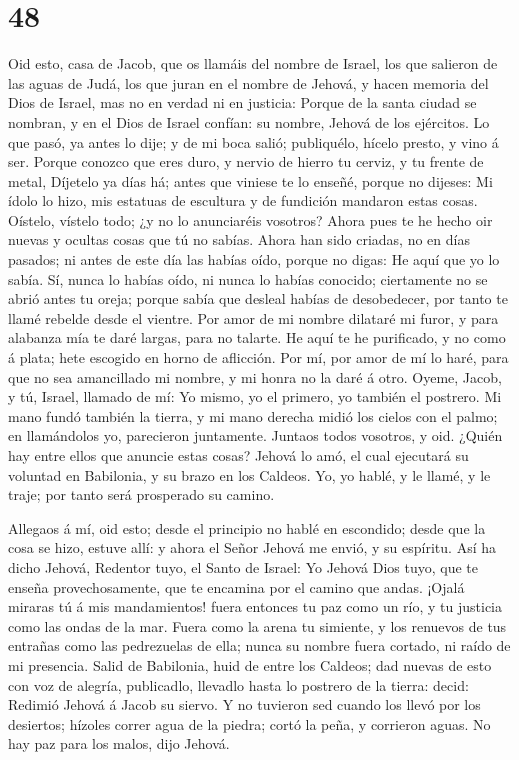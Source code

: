 \hypertarget{section-47}{%
\section{48}\label{section-47}}

 Oid esto, casa de Jacob, que os llamáis del nombre de
Israel, los que salieron de las aguas de Judá, los que juran en el
nombre de Jehová, y hacen memoria del Dios de Israel, mas no en verdad
ni en justicia:  Porque de la santa ciudad se nombran, y en
el Dios de Israel confían: su nombre, Jehová de los ejércitos.
 Lo que pasó, ya antes lo dije; y de mi boca salió;
publiquélo, hícelo presto, y vino á ser.  Porque conozco que
eres duro, y nervio de hierro tu cerviz, y tu frente de metal,
 Díjetelo ya días há; antes que viniese te lo enseñé, porque
no dijeses: Mi ídolo lo hizo, mis estatuas de escultura y de fundición
mandaron estas cosas.  Oístelo, vístelo todo; ¿y no lo
anunciaréis vosotros? Ahora pues te he hecho oir nuevas y ocultas cosas
que tú no sabías.  Ahora han sido criadas, no en días
pasados; ni antes de este día las habías oído, porque no digas: He aquí
que yo lo sabía.  Sí, nunca lo habías oído, ni nunca lo
habías conocido; ciertamente no se abrió antes tu oreja; porque sabía
que desleal habías de desobedecer, por tanto te llamé rebelde desde el
vientre.  Por amor de mi nombre dilataré mi furor, y para
alabanza mía te daré largas, para no talarte.  He aquí te
he purificado, y no como á plata; hete escogido en horno de aflicción.
 Por mí, por amor de mí lo haré, para que no sea
amancillado mi nombre, y mi honra no la daré á otro. 
Oyeme, Jacob, y tú, Israel, llamado de mí: Yo mismo, yo el primero, yo
también el postrero.  Mi mano fundó también la tierra, y mi
mano derecha midió los cielos con el palmo; en llamándolos yo,
parecieron juntamente.  Juntaos todos vosotros, y oid.
¿Quién hay entre ellos que anuncie estas cosas? Jehová lo amó, el cual
ejecutará su voluntad en Babilonia, y su brazo en los Caldeos.
 Yo, yo hablé, y le llamé, y le traje; por tanto será
prosperado su camino.

 Allegaos á mí, oid esto; desde el principio no hablé en
escondido; desde que la cosa se hizo, estuve allí: y ahora el Señor
Jehová me envió, y su espíritu.  Así ha dicho Jehová,
Redentor tuyo, el Santo de Israel: Yo Jehová Dios tuyo, que te enseña
provechosamente, que te encamina por el camino que andas. 
¡Ojalá miraras tú á mis mandamientos! fuera entonces tu paz como un río,
y tu justicia como las ondas de la mar.  Fuera como la
arena tu simiente, y los renuevos de tus entrañas como las pedrezuelas
de ella; nunca su nombre fuera cortado, ni raído de mi presencia.
 Salid de Babilonia, huid de entre los Caldeos; dad nuevas
de esto con voz de alegría, publicadlo, llevadlo hasta lo postrero de la
tierra: decid: Redimió Jehová á Jacob su siervo.  Y no
tuvieron sed cuando los llevó por los desiertos; hízoles correr agua de
la piedra; cortó la peña, y corrieron aguas.  No hay paz
para los malos, dijo Jehová.

